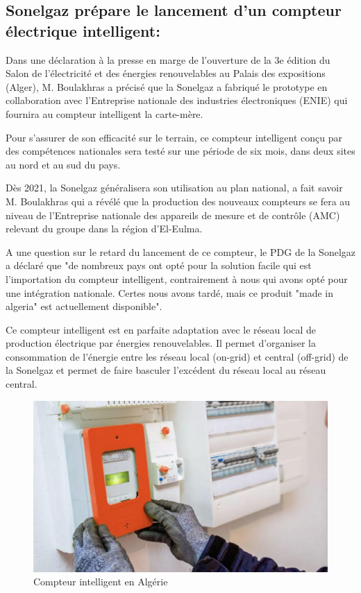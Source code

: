 \subsection{Sonelgaz prépare le lancement d'un compteur électrique intelligent:}

Dans une déclaration à la presse en marge de l'ouverture de la 3e édition du Salon de l’électricité et des énergies renouvelables au Palais des expositions (Alger), M. Boulakhras a précisé que la Sonelgaz a fabriqué le prototype en collaboration avec l'Entreprise nationale des industries électroniques (ENIE) qui fournira au compteur intelligent la carte-mère.

Pour s'assurer de son efficacité sur le terrain, ce compteur intelligent conçu par des compétences nationales sera testé sur une période de six mois, dans deux sites au nord et au sud du pays.

Dès 2021, la Sonelgaz généralisera son utilisation au plan national, a fait savoir M. Boulakhras qui a révélé que la production des nouveaux compteurs se fera au niveau de l'Entreprise nationale des appareils de mesure et de contrôle (AMC) relevant du groupe dans la région d'El-Eulma.

A une question sur le retard du lancement de ce compteur, le PDG de la Sonelgaz a déclaré que "de nombreux pays ont opté pour la solution facile qui est l'importation du compteur intelligent, contrairement à nous qui avons opté pour une intégration nationale. Certes nous avons tardé, mais ce produit "made in algeria" est actuellement disponible".

Ce compteur intelligent est en parfaite adaptation avec le réseau local de production électrique par énergies renouvelables. Il permet d'organiser la consommation de l'énergie entre les réseau local (on-grid) et central (off-grid) de la Sonelgaz et permet de faire basculer l'excédent du réseau local au réseau central.
\\
\begin{figure}[h]
	\centering
    \includegraphics[scale=0.3]{img/part2/1.7}
    \caption{Compteur intelligent en Algérie}
\end{figure}